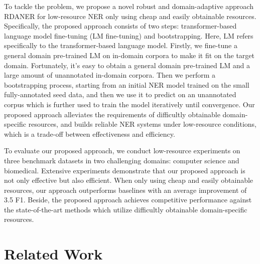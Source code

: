 \documentclass[10pt, conference, compsocconf]{IEEEtran}
\newcommand{\rdaner}{\textsc{RDANER}\xspace}
\begin{document}
To tackle the problem, we propose a novel robust and domain-adaptive approach \rdaner for low-resource NER only using cheap and easily obtainable resources. 
Specifically, the proposed approach consists of two steps: transformer-based language model fine-tuning (LM fine-tuning) and bootstrapping.
Here, LM refers specifically to the transformer-based language model.
Firstly, we fine-tune a general domain pre-trained LM on in-domain corpora to make it
fit on the target domain. Fortunately, it's easy to obtain a general domain pre-trained LM and a large amount of unannotated in-domain corpora.
Then we perform a bootstrapping process, starting from an initial NER model trained on
the small fully-annotated seed data, and then we use it to predict on an unannotated corpus
which is further used to train the model iteratively until convergence.
Our proposed approach alleviates the requirements of difficultly obtainable domain-specific resources, and builds reliable NER systems 
under low-resource conditions, which is a trade-off between effectiveness and efficiency.





To evaluate our proposed approach, we conduct low-resource experiments 
on three benchmark datasets in two challenging domains: computer science and biomedical.
Extensive experiments demonstrate that our proposed approach is not only effective but also efficient.
When only using cheap and easily obtainable resources, our approach outperforms 
baselines with an average improvement of 3.5 F1. Beside, the proposed approach achieves competitive performance against the state-of-the-art
methods which utilize difficultly obtainable domain-specific resources.











\section{Related Work}
\end{document}
